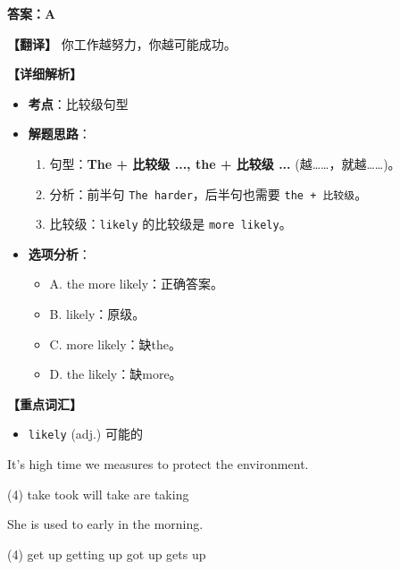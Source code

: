 \documentclass[11pt, a4paper]{article}
\newcommand{\analysis}[4]{
    \begin{solutionbox}
        \textbf{答案：#1}
        
        \textbf{【翻译】} #2
        
        \textbf{【详细解析】}
        #3
        
        \textbf{【重点词汇】}
        #4
    \end{solutionbox}
}
\newcommand{\blank}{\underline{\hspace{1.5cm}}}
\begin{document}
\begin{questions}
{\begin{itemize}
        \end{itemize}
    }
    \analysis{A}{你工作越努力，你越可能成功。}{
        \begin{itemize}
            \item \textbf{考点}：比较级句型
            \item \textbf{解题思路}：
                \begin{enumerate}
                    \item 句型：\textbf{The + 比较级 ..., the + 比较级 ...} (越……，就越……)。
                    \item 分析：前半句 \texttt{The harder}，后半句也需要 \texttt{the + 比较级}。
                    \item 比较级：\texttt{likely} 的比较级是 \texttt{more likely}。
                \end{enumerate}
            \item \textbf{选项分析}：
                \begin{itemize}
                    \item A. the more likely：正确答案。
                    \item B. likely：原级。
                    \item C. more likely：缺the。
                    \item D. the likely：缺more。
                \end{itemize}
        \end{itemize}
    }{
        \begin{itemize}
            \item \texttt{likely} (adj.) 可能的
        \end{itemize}
    }

    \item It's high time we \blank measures to protect the environment.
    \begin{tasks}(4)
        \task take \task took \task will take \task are taking
    \end{tasks}

    \item She is used to \blank early in the morning.
    \begin{tasks}(4)
        \task get up \task getting up \task got up \task gets up
    \end{tasks}


\end{questions}
\end{document}
